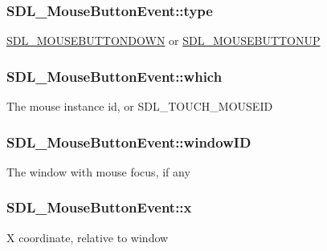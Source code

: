 \subsubsection[{type}]{ S\+D\+L\+\_\+\+Mouse\+Button\+Event\+::type}\label{struct_s_d_l___mouse_button_event_af64cb09ea68b8081ecc8ee498552e3d7}
\hyperlink{_s_d_l__events_8h_a3b589e89be6b35c02e0dd34a55f3fccaa9267166e1536dfa8b0daa98c0afa9052}{S\+D\+L\+\_\+\+M\+O\+U\+S\+E\+B\+U\+T\+T\+O\+N\+D\+O\+W\+N} or \hyperlink{_s_d_l__events_8h_a3b589e89be6b35c02e0dd34a55f3fccaa4ab85278398d29b9e50f500aad2b952b}{S\+D\+L\+\_\+\+M\+O\+U\+S\+E\+B\+U\+T\+T\+O\+N\+U\+P} \hypertarget{struct_s_d_l___mouse_button_event_a366aef59a0f393afc8a3561e741825df}{}
\subsubsection[{which}]{ S\+D\+L\+\_\+\+Mouse\+Button\+Event\+::which}\label{struct_s_d_l___mouse_button_event_a366aef59a0f393afc8a3561e741825df}
The mouse instance id, or S\+D\+L\+\_\+\+T\+O\+U\+C\+H\+\_\+\+M\+O\+U\+S\+E\+I\+D \hypertarget{struct_s_d_l___mouse_button_event_ab3b855d4b543b5d02fcf5d56e4421393}{}
\subsubsection[{window\+I\+D}]{ S\+D\+L\+\_\+\+Mouse\+Button\+Event\+::window\+I\+D}\label{struct_s_d_l___mouse_button_event_ab3b855d4b543b5d02fcf5d56e4421393}
The window with mouse focus, if any \hypertarget{struct_s_d_l___mouse_button_event_a5bb9c61b86e999f58637511e32e3a076}{}
\subsubsection[{x}]{ S\+D\+L\+\_\+\+Mouse\+Button\+Event\+::x}\label{struct_s_d_l___mouse_button_event_a5bb9c61b86e999f58637511e32e3a076}
X coordinate, relative to window \hypertarget{struct_s_d_l___mouse_button_event_a7ccb5c55a7ddadce723f4ea6d5269540}{}
